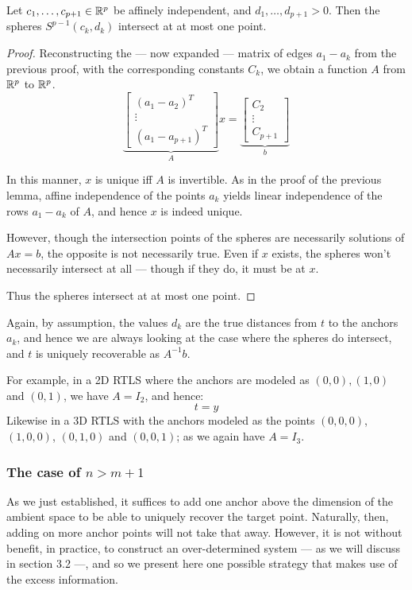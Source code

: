 \begin{Lemma}
    Let $c_1, \dots, c_{p+1}\in\mathbb R^p$ be affinely independent, and $d_1, \dots, d_{p+1} > 0$. Then the spheres $S^{p-1}(c_k,d_k)$ intersect at at most one point.
\end{Lemma}

\begin{proof}
Reconstructing the --- now expanded --- matrix of edges $a_1-a_k$ from the previous proof, with the corresponding constants $C_k$, we obtain a function $A$ from $\mathbb R^p$ to $\mathbb R^p$.
\[
\underbrace{
\begin{bmatrix}
    (a_1 - a_2)^T \\
    \vdots \\
    (a_1 - a_{p+1})^T
\end{bmatrix}}_A x =
\underbrace{
\begin{bmatrix}
    C_2 \\
    \vdots \\
    C_{p+1}
\end{bmatrix}}_b
\]

In this manner, $x$ is unique iff $A$ is invertible. As in the proof of the previous lemma, affine independence of the points $a_k$ yields linear independence of the rows $a_1-a_k$ of $A$, and hence $x$ is indeed unique.

However, though the intersection points of the spheres are necessarily solutions of $Ax=b$, the opposite is not necessarily true. Even if $x$ exists, the spheres won't necessarily intersect at all --- though if they do, it must be at $x$.

Thus the spheres intersect at at most one point.
\end{proof}

Again, by assumption, the values $d_k$ are the true distances from $t$ to the anchors $a_k$, and hence we are always looking at the case where the spheres do intersect, and $t$ is uniquely recoverable as $A^{-1}b$.

For example, in a 2D RTLS where the anchors are modeled as $(0,0), (1,0)$ and $(0,1)$, we have $A=I_2$, and hence:
\[
    t = y 
\]
Likewise in a 3D RTLS with the anchors modeled as the points $(0,0,0)$, $(1,0,0)$, $(0,1,0)$ and $(0,0,1)$; as we again have $A=I_3$.

\subsubsection{The case of $n>m+1$}
As we just established, it suffices to add one anchor above the dimension of the ambient space to be able to uniquely recover the target point. Naturally, then, adding on more anchor points will not take that away. However, it is not without benefit, in practice, to construct an over-determined system --- as we will discuss in section 3.2 ---, and so we present here one possible strategy that makes use of the excess information.

